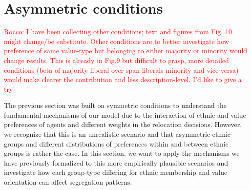 \documentclass{article}
\newcommand{\rocco}[1]{{\textcolor{red}{Rocco: #1}}} %
\begin{document}
\section*{Asymmetric conditions}

\rocco{I have been collecting other conditions; text and figures from Fig. 10 might change/be substitute. Other conditions are to better investigate how preference of same value-type but belonging to either majority or minority would change results. This is already in Fig.9 but difficult to grasp, more  detailed conditions (beta of majority liberal over span liberals minority and vice versa) would make clearer the contribution and less description-level. I'd like to give a try}

The previous section was built on symmetric conditions to understand the fundamental mechanisms of our model due to the interaction of ethnic and value preferences of agents and different weights in the relocation decisions. However, we recognize that this is an unrealistic scenario and that asymmetric ethnic groups and different distributions of preferences within and between ethnic groups is rather the case. In this section, we want to apply the mechanisms we have previously formalized to this more empirically plausible scenarios and investigate how each group-type differing for ethnic membership and value orientation can affect segregation patterns. 
\end{document}
